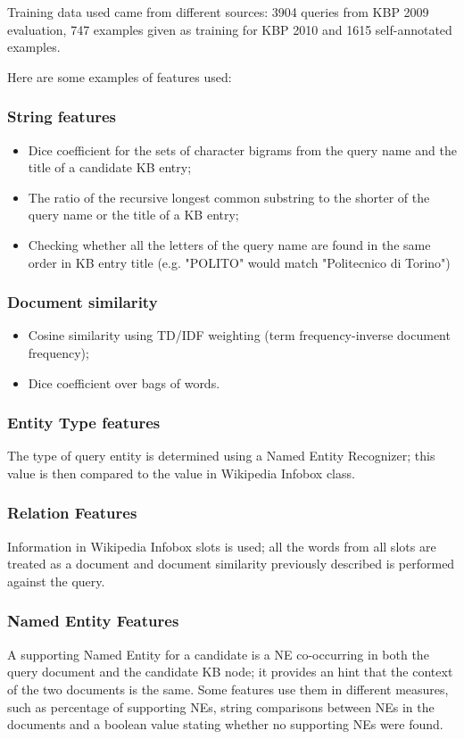 \documentclass[a4paper,11pt]{report}
\begin{document}
Training data used came from different sources: 3904 queries from KBP 2009 evaluation, 747 examples given as training for KBP 2010 and 1615 self-annotated examples.

Here are some examples of features used:
\subsubsection{String features}

\begin{itemize}
\item Dice coefficient for the sets of character bigrams from the query name and the title of a candidate KB entry;
\item The ratio of the recursive longest common substring to the shorter of the query name or the title of a KB entry;
\item Checking whether all the letters of the query name are found in the same order in KB entry title (e.g. "POLITO" would match "Politecnico di Torino")
\end{itemize}

\subsubsection{Document similarity}

\begin{itemize}
\item Cosine similarity using TD/IDF weighting (term frequency-inverse document frequency);
\item Dice coefficient over bags of words.
\end{itemize}

\subsubsection{Entity Type features}
The type of query entity is determined using a Named Entity Recognizer; this value is then compared to the value in Wikipedia Infobox class.

\subsubsection{Relation Features}
Information in Wikipedia Infobox slots is used; all the words from all slots are treated as a document and document similarity previously described is performed against the query.

\subsubsection{Named Entity Features}
A supporting Named Entity for a candidate is a NE co-occurring in both the query document and the candidate KB node; it provides an hint that the context of the two documents is the same. Some features use them in different measures, such as percentage of supporting NEs, string comparisons between NEs in the documents and a boolean value stating whether no supporting NEs were found.
\end{document}
